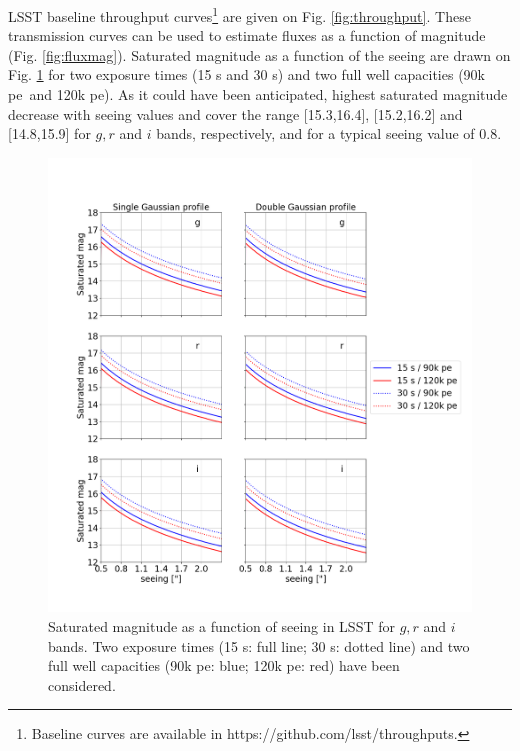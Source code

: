 \documentclass[\docopts]{\docclass}
\newcommand{\pe}{{pe}}
\begin{document}
LSST baseline throughput curves\footnote{Baseline curves are available in https://github.com/lsst/throughputs.} are given on Fig. \ref{fig:throughput}. These transmission curves can be used to estimate fluxes as a function of magnitude (Fig. \ref{fig:fluxmag}). Saturated magnitude as a function of the seeing are drawn on Fig. \ref{fig:magsat} for two exposure times (15 s and 30 s) and two full well capacities (90k \pe~and 120k \pe). As it could have been anticipated, highest saturated magnitude decrease with seeing values and cover the range [15.3,16.4], [15.2,16.2] and [14.8,15.9] for $g,r$ and $i$ bands, respectively, and for a typical seeing value of 0.8\arcsec. 
\begin{figure}[htbp]
 \includegraphics[width=1.1\textwidth]{magsat.png}
 \caption{Saturated magnitude as a function of seeing in LSST for $g, r$ and $i$ bands. Two exposure times (15 s: full line; 30 s: dotted line) and two full well capacities (90k \pe: blue; 120k \pe: red) have been considered.}\label{fig:magsat}
\end{figure}
\end{document}
